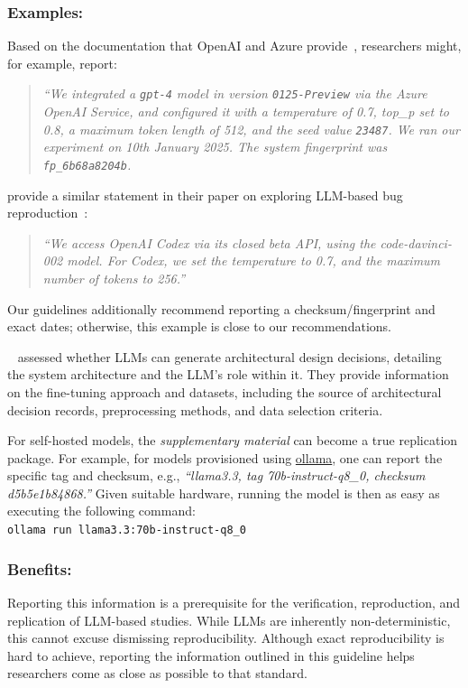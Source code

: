 \documentclass[smallextended]{svjour3}
\newcommand{\supplementarymaterial}{\emph{supplementary material}\xspace}
\newcommand{\supplementarymaterial}{\emph{supplementary material}\xspace}
\newcommand{\guidelinesubsubsection}[1]{\subsubsection{\bfseries #1:}}
\newcommand{\guidelinesubsubsection}[1]{\subsubsection{#1}}
\begin{document}
\guidelinesubsubsection{Examples}

Based on the documentation that OpenAI and Azure provide~\cite{OpenAI25, Azure25}, researchers might, for example, report:

\begin{quote}
\it
 ``We integrated a  \texttt{gpt-4} model in version \texttt{0125-Preview} via the Azure OpenAI Service, and configured it with a temperature of 0.7, top\_p set to 0.8, a maximum token length of 512, and the  seed value \texttt{23487}.
 We ran our experiment on 10th January 2025. The system fingerprint was \texttt{fp\_6b68a8204b}.
\end{quote}

\citeauthor{DBLP:conf/icse/KangYY23} provide a similar statement in their paper on exploring LLM-based bug reproduction~\cite{DBLP:conf/icse/KangYY23}:

\begin{quote}
\it
``We access OpenAI Codex via its closed beta API, using the code-davinci-002 model. For Codex, we set the temperature to 0.7, and the maximum number of tokens to 256.''
\end{quote}

Our guidelines additionally recommend reporting a checksum/fingerprint and exact dates; otherwise, this example is close to our recommendations.

\citeauthor{DBLP:conf/icsa/DharVV24}~\cite{DBLP:conf/icsa/DharVV24} assessed whether LLMs can generate architectural design decisions, detailing the system architecture and the LLM's role within it.
They provide information on the fine-tuning approach and datasets, including the source of architectural decision records, preprocessing methods, and data selection criteria.

For self-hosted models, the \supplementarymaterial can become a true replication package. For example, for models provisioned using \href{https://ollama.com/library/}{ollama}, one can report the specific tag and checksum, e.g., \emph{``llama3.3, tag 70b-instruct-q8\_0, checksum d5b5e1b84868.''}
Given suitable hardware, running the model is then as easy as executing the following command:\\
\texttt{ollama run llama3.3:70b-instruct-q8\_0}

\guidelinesubsubsection{Benefits}

Reporting this information is a prerequisite for the verification, reproduction, and replication of LLM-based studies. While LLMs are inherently non-deterministic, this cannot excuse dismissing reproducibility. Although exact reproducibility is hard to achieve, reporting the information outlined in this guideline helps researchers come as close as possible to that standard.
\end{document}
